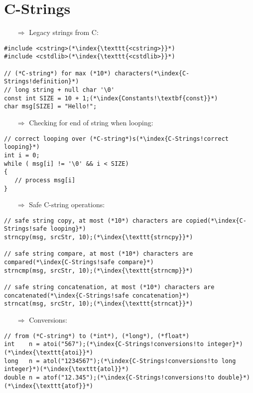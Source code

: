 \documentclass[10pt]{article}
\begin{document}
\section{C-Strings}
\small
\begin{enumerate}
\item[$\Rightarrow$] Legacy strings from C:
\end{enumerate}
\begin{lstlisting}
#include <cstring>(*\index{\texttt{<cstring>}}*)
#include <cstdlib>(*\index{\texttt{<cstdlib>}}*)

// (*C-string*) for max (*10*) characters(*\index{C-Strings!definition}*)
// long string + null char '\0'
const int SIZE = 10 + 1;(*\index{Constants!\textbf{const}}*)
char msg[SIZE] = "Hello!";
\end{lstlisting}
\begin{enumerate}
\item[$\Rightarrow$] Checking for end of string when looping:
\end{enumerate}
\begin{lstlisting}
// correct looping over (*C-string*)s(*\index{C-Strings!correct looping}*)
int i = 0;
while ( msg[i] != '\0' && i < SIZE)
{
   // process msg[i]
}
\end{lstlisting}
\begin{enumerate}
\item[$\Rightarrow$] Safe C-string operations:
\end{enumerate}
\begin{lstlisting}
// safe string copy, at most (*10*) characters are copied(*\index{C-Strings!safe looping}*)
strncpy(msg, srcStr, 10);(*\index{\texttt{strncpy}}*)

// safe string compare, at most (*10*) characters are compared(*\index{C-Strings!safe compare}*)
strncmp(msg, srcStr, 10);(*\index{\texttt{strncmp}}*)

// safe string concatenation, at most (*10*) characters are concatenated(*\index{C-Strings!safe concatenation}*)
strncat(msg, srcStr, 10);(*\index{\texttt{strncat}}*)
\end{lstlisting}
\begin{enumerate}
\item[$\Rightarrow$] Conversions:
\end{enumerate}
\begin{lstlisting}
// from (*C-string*) to (*int*), (*long*), (*float*)
int    n = atoi("567");(*\index{C-Strings!conversions!to integer}*)(*\index{\texttt{atoi}}*)
long   n = atol("1234567");(*\index{C-Strings!conversions!to long integer}*)(*\index{\texttt{atol}}*)
double n = atof("12.345");(*\index{C-Strings!conversions!to double}*)(*\index{\texttt{atof}}*)
\end{lstlisting}
%
%
\end{document}

